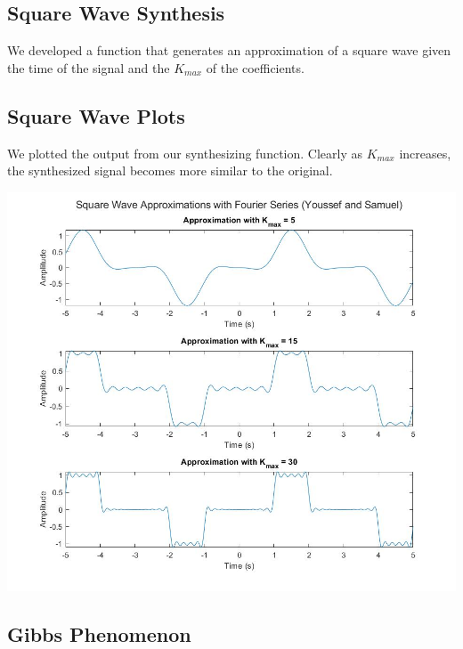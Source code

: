 \documentclass[11pt]{article}
\begin{document}
\begin{framed}
	
\end{framed}

\subsection{Square Wave Synthesis}

We developed a function that generates an approximation of a square wave
given the time of the signal and the $K_{max}$ of the coefficients.

\begin{framed}
	
\end{framed}

\pagebreak
\subsection{Square Wave Plots}

We plotted the output from our synthesizing function.
Clearly as $K_{max}$ increases, the synthesized signal becomes
more similar to the original.

\includegraphics[width=\textwidth]{squarewaves.png}

\begin{framed}
	
\end{framed}

\subsection{Gibbs Phenomenon}
\end{document}
